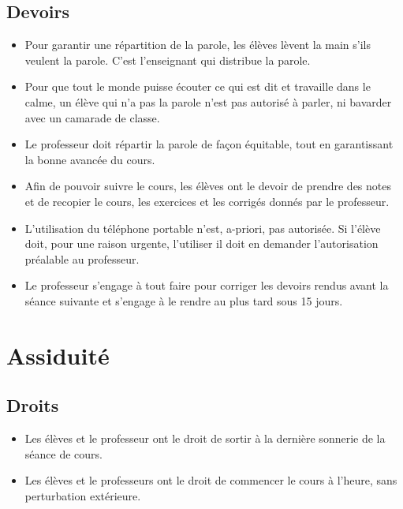 \documentclass[10pt,fleqn]{article} %
\begin{document}
\subsection{Devoirs}
\begin{itemize}
    \item Pour garantir une répartition de la parole, les élèves lèvent la main s'ils veulent la parole. C'est l'enseignant qui distribue  la parole. 
    \item Pour que tout le monde puisse écouter ce qui est dit et travaille dans le calme, un élève qui n'a pas la parole n'est pas autorisé à parler, ni bavarder avec un camarade de classe. 
    \item Le professeur doit répartir la parole de façon équitable, tout en garantissant la bonne avancée du cours. 
    \item Afin de pouvoir suivre le cours, les élèves ont le devoir de prendre des notes et de recopier le cours, les exercices et les corrigés donnés par le professeur. 
    \item L'utilisation du téléphone portable n'est, a-priori, pas autorisée. Si l'élève doit, pour une raison urgente, l'utiliser il doit en demander l'autorisation préalable au professeur.  
    \item Le professeur s'engage à tout faire pour corriger les devoirs rendus avant la séance suivante et s'engage à le rendre au plus tard sous 15 jours. 
\end{itemize}

\section{Assiduité}
\subsection{Droits}
\begin{itemize}
    \item Les élèves et le professeur ont le droit de sortir à la dernière sonnerie de la séance de cours.
    \item Les élèves et le professeurs ont le droit de commencer le cours à l'heure, sans perturbation extérieure. 
\end{itemize}
\end{document}

